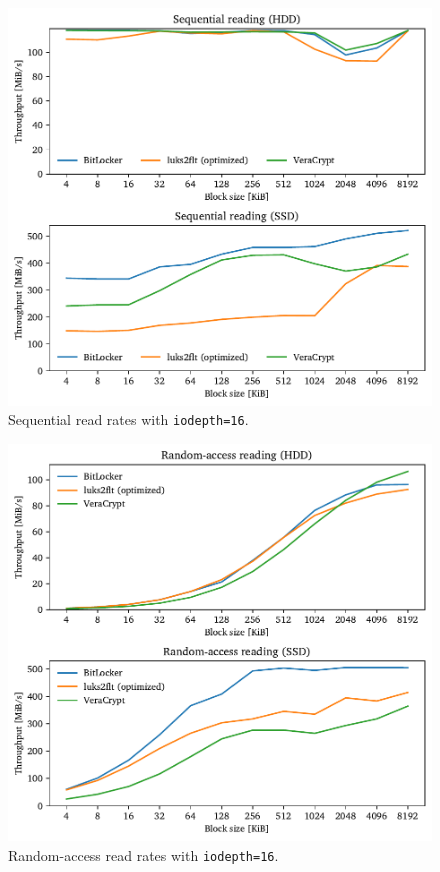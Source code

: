 \begin{figure}[htb!]
	\center
	\includegraphics[scale=1]{../fig/performance.hwexperiments.optseqqueue.pdf}
	\caption[
		Sequential read rates with \texttt{iodepth=16}
	]{
		Sequential read rates with \texttt{iodepth=16}. 
	}
	\label{fig:performance.hwexperiments.optseqqueue}
\end{figure}

\begin{figure}[htb!]
	\center
	\includegraphics[scale=1]{../fig/performance.hwexperiments.optrandqueue.pdf}
	\caption[
		Random-access read rates with \texttt{iodepth=16}
	]{
		Random-access read rates with \texttt{iodepth=16}. 
	}
	\label{fig:performance.hwexperiments.optrandqueue}
\end{figure}

